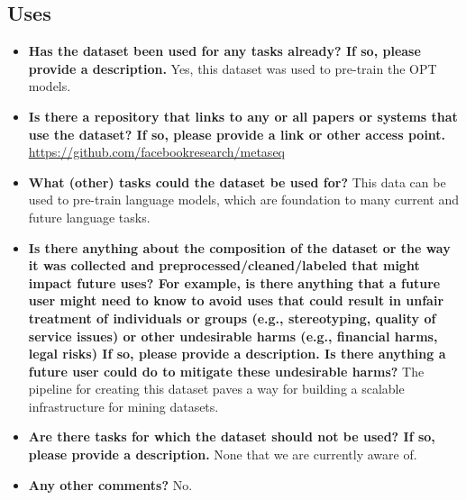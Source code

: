 \subsection{Uses}
\begin{itemize}
    \item \textbf{Has the dataset been used for any tasks already? If so, please provide a description.} Yes, this dataset was used to pre-train the OPT models.
    \item \textbf{Is there a repository that links to any or all papers or systems that use the dataset? If so, please provide a link or other access point.} \url{https://github.com/facebookresearch/metaseq}
    \item \textbf{What (other) tasks could the dataset be used for?} This data can be used to pre-train language models, which are foundation to many current and future language tasks.
    \item \textbf{Is there anything about the composition of the dataset or the way it was collected and preprocessed/cleaned/labeled that might impact future uses? For example, is there anything that a future user might need to know to avoid uses that could result in unfair treatment of individuals or groups (e.g., stereotyping, quality of service issues) or other undesirable harms (e.g., financial harms, legal risks) If so, please provide a description. Is there anything a future user could do to mitigate these undesirable harms?} The pipeline for creating this dataset paves a way for building a scalable infrastructure for mining datasets.
    \item \textbf{Are there tasks for which the dataset should not be used? If so, please provide a description.} None that we are currently aware of.
    \item \textbf{Any other comments?} No.
\end{itemize}

